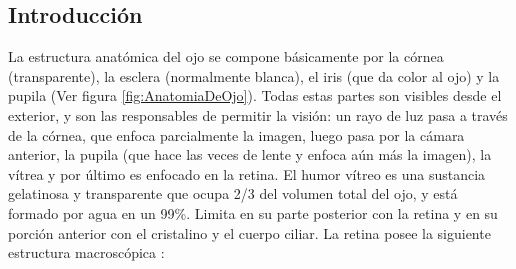 \subsection{Introducci\'on}

La estructura anatómica del ojo se compone básicamente por la córnea (transparente), la esclera (normalmente blanca), el iris (que da color al ojo) y la pupila (Ver figura \ref{fig:AnatomiaDeOjo}). Todas estas partes son visibles desde el exterior, y son las responsables de permitir la visión: un rayo de luz pasa a través de la córnea, que enfoca parcialmente la imagen, luego pasa por la cámara anterior, la pupila (que hace las veces de lente y enfoca aún más la imagen), la vítrea y por último es enfocado en la retina. El humor v\'itreo es una sustancia gelatinosa y transparente que ocupa 2/3 del volumen total del ojo, y est\'a formado por agua en un 99\%. Limita en su parte posterior con la retina y en su porci\'on anterior con el cristalino y el cuerpo ciliar. 
La retina posee la siguiente estructura macrosc\'opica \cite{patton2006retinal}:
